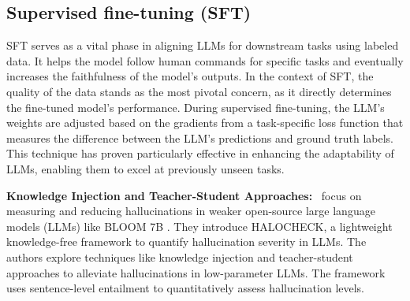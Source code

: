 \documentclass[11pt]{article}
\begin{document}
\subsection{Supervised fine-tuning (SFT)}
\label{subsubsec:Supervised fine-tuning (SFT)}
SFT  serves as a vital phase in aligning LLMs for downstream tasks using labeled data. It helps the model follow human commands for specific tasks \cite{wang2023selfinstruct,chung2022scaling,iyer2023optiml,sun2023principledriven} and eventually increases the faithfulness of the model's outputs. In the context of SFT, the quality of the data stands as the most pivotal concern, as it directly determines the fine-tuned model's performance\cite{xu2023wizardlm,touvron2023llama}. During supervised fine-tuning, the LLM's weights are adjusted based on the gradients from a task-specific loss function that measures the difference between the LLM's predictions and ground truth labels. This technique has proven particularly effective in enhancing the adaptability of LLMs, enabling them to excel at previously unseen tasks.


\textbf{Knowledge Injection and Teacher-Student Approaches:}~\cite{elaraby2023halo} focus on measuring and reducing hallucinations in weaker open-source large language models (LLMs) like BLOOM 7B \cite{workshop2022bloom}. They introduce HALOCHECK, a lightweight knowledge-free framework to quantify hallucination severity in LLMs. The authors explore techniques like knowledge injection and teacher-student approaches to alleviate hallucinations in low-parameter LLMs. The framework uses sentence-level entailment to quantitatively assess hallucination levels.
\end{document}
